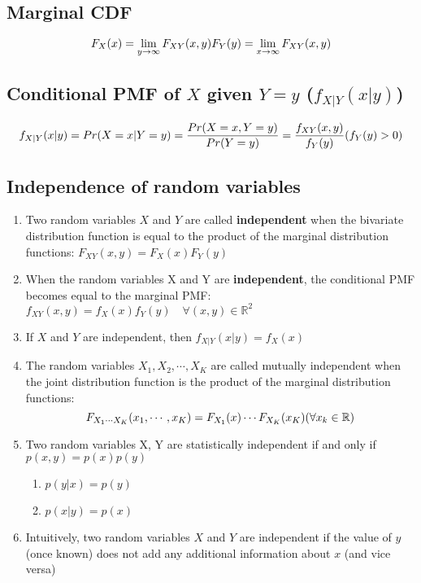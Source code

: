 \subsection{Marginal CDF \cite{ism-1}}\label{Multivariate Distributions: Marginal CDF}
\[
    \hfill
    F_X(x) = \lim_{y\to\infty} F_{XY}(x, y)
    \hfill
    F_Y(y) = \lim_{x\to\infty} F_{XY}(x, y)
    \hfill
\]


\subsection{Conditional PMF of $X$ given $Y = y$ ($f_{X|Y}(x|y)$) \cite{ism-1}}\label{Multivariate Distributions: conditional PMF}

\[
    f_{X|Y}(x|y) = Pr(X=x|Y=y)
    =\dfrac{Pr(X=x, Y=y)}{Pr(Y=y)} 
    = \dfrac{f_{XY}(x,y)}{f_Y(y)}
    \hfill
    (f_Y(y) > 0)
\]

\subsection{Independence of random variables \cite{ism-1}} \label{Multivariate Distributions: Independence of random variables}

\begin{enumerate}
    \item Two random variables $X$ and $Y$ are called \textbf{independent} when the bivariate distribution function is equal to the product of the marginal distribution functions: $F_{XY}(x, y) = F_X(x)F_Y(y)$

    \item When the random variables X and Y are \textbf{independent}, the conditional PMF becomes equal to the marginal PMF: $f_{XY}(x, y) = f_X(x)f_Y(y) \quad\forall (x,y) \in \mathbb{R}^2$

    \item If $X$ and $Y$ are independent, then $f_{X|Y}(x|y) = f_X(x)$

    \item The random variables $X_1, X_2,\cdots, X_K$ are called mutually independent when the joint distribution function is the product of the marginal distribution functions:
    \[
        F_{X_1\cdots X_K}(x_1,\cdots, x_K) = F_{X_1}(x)\cdots F_{X_K}(x_K)
        \hfill
        (\forall x_k \in \mathbb{R})
    \]

    \item Two random variables X, Y are statistically independent if and only if $p(x,y) = p(x)p(y)$ \cite{mfml-1}
    \begin{enumerate}
        \item $ p(y | x) = p(y)$
        \item $ p(x | y) = p(x)$
    \end{enumerate}

    \item Intuitively, two random variables $X$ and $Y$ are independent if the value of $y$ (once known) does not add any additional information about $x$ (and vice versa) \cite{mfml-1}
\end{enumerate}

